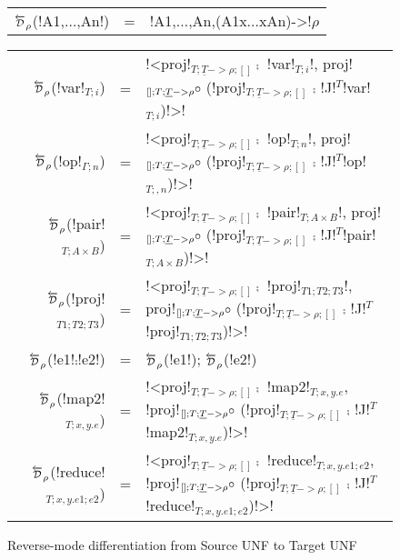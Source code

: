 \begin{figure*}[t]
    \begin{tabular}{r c l}
        $\Dsynrevsymbol_{\rho}$(!A1,$\ldots$,An!) &=& !A1,$\ldots$,An,(A1x$\ldots$xAn)->!$\rho$
    \end{tabular}

    \medskip
    \begin{tabular}{r c l}
    $\Dsynrevsymbol_{\rho}$(!var!$_{T;i}$) &=& !<proj!$_{T;\underline{T}->\rho;[]} \comp$ !var!$_{T;i}$!, proj!$_{[];T;\underline{T}->\rho} \circ$ (!proj!$_{T;\underline{T}->\rho;[]}$ $\comp$ !J!$^T$!var!$_{T;i}$)!>! \\
    $\Dsynrevsymbol_{\rho}$(!op!$_{\Gamma;n}$) &=& !<proj!$_{T;\underline{T}->\rho;[]} \comp$ !op!$_{T;n}$!, proj!$_{[];T;\underline{T}->\rho} \circ$ (!proj!$_{T;\underline{T}->\rho;[]}$ $\comp$ !J!$^T$!op!$_{T;,n}$)!>! \\ 
    $\Dsynrevsymbol_{\rho}$(!pair!$_{T;A\times B}$) &=& !<proj!$_{T;\underline{T}->\rho;[]} \comp$ !pair!$_{T;A\times B}$!, proj!$_{[];T;\underline{T}->\rho} \circ$ (!proj!$_{T;\underline{T}->\rho;[]}$ $\comp$ !J!$^T$!pair!$_{T;A\times B}$)!>! \\
    $\Dsynrevsymbol_{\rho}$(!proj!$_{T1;T2;T3}$) &=& !<proj!$_{T;\underline{T}->\rho;[]} \comp$ !proj!$_{T1;T2;T3}$!, proj!$_{[];T;\underline{T}->\rho} \circ$ (!proj!$_{T;\underline{T}->\rho;[]}$ $\comp$ !J!$^T$!proj!$_{T1;T2;T3}$)!>! \\
    $\Dsynrevsymbol_{\rho}$(!e1!$\comp$!e2!) &=& $\Dsynrevsymbol_{\rho}$(!e1!); $\Dsynrevsymbol_{\rho}$(!e2!)\\ 
    $\Dsynrevsymbol_{\rho}$(!map2!$_{T;x,y.e}$) &=& !<proj!$_{T;\underline{T}->\rho;[]} \comp$ !map2!$_{T;x,y.e}$, !proj!$_{[];T;\underline{T}->\rho} \circ$ (!proj!$_{T;\underline{T}->\rho;[]}$ $\comp$ !J!$^T$!map2!$_{T;x,y.e}$)!>! \\
    $\Dsynrevsymbol_{\rho}$(!reduce!$_{T;x,y.e1;e2}$) &=& !<proj!$_{T;\underline{T}->\rho;[]} \comp$ !reduce!$_{T;x,y.e1;e2}$, !proj!$_{[];T;\underline{T}->\rho} \circ$ (!proj!$_{T;\underline{T}->\rho;[]}$ $\comp$ !J!$^T$!reduce!$_{T;x,y.e1;e2}$)!>! \\
    \end{tabular}
    \caption{Reverse-mode differentiation from Source UNF to Target UNF}
    \label{fig:diff_macro}    
\end{figure*}